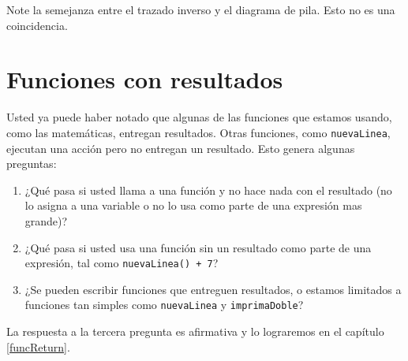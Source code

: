 
Note la semejanza entre el trazado inverso y el diagrama de pila.
Esto no es una coincidencia.

\section{Funciones con resultados}

Usted ya puede haber notado que algunas de las funciones que estamos
usando, como las matemáticas, entregan resultados. Otras funciones,
como \texttt{nuevaLinea}, ejecutan una acción pero no entregan un
resultado. Esto genera algunas preguntas:
\begin{enumerate}
\item ¿Qué pasa si usted llama a una función y no hace nada con el resultado
(no lo asigna a una variable o no lo usa como parte de una expresión
mas grande)?
\item ¿Qué pasa si usted usa una función sin un resultado como parte de
una expresión, tal como \texttt{nuevaLinea() + 7}?
\item ¿Se pueden escribir funciones que entreguen resultados, o estamos
limitados a funciones tan simples como \texttt{nuevaLinea} y \texttt{imprimaDoble}?
\end{enumerate}
La respuesta a la tercera pregunta es afirmativa y lo lograremos en
el capítulo \ref{funcReturn}.

